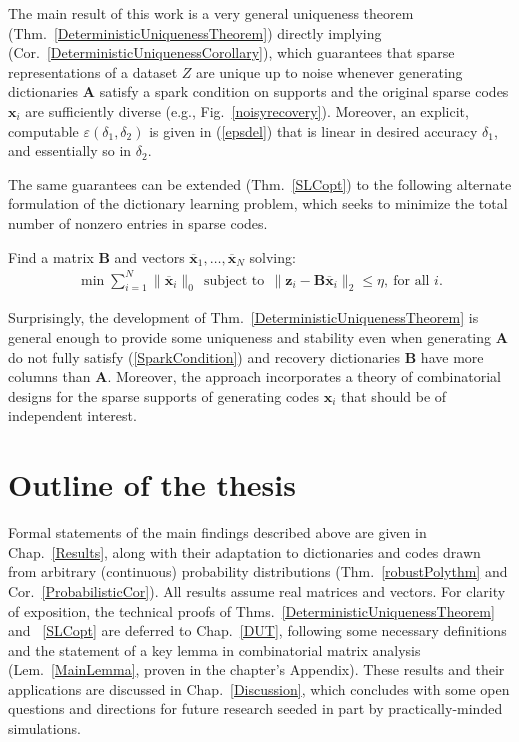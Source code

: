 The main result of this work is a very general uniqueness theorem (Thm.~\ref{DeterministicUniquenessTheorem}) directly 
implying (Cor.~\ref{DeterministicUniquenessCorollary}), which guarantees that sparse representations of a dataset $Z$ are unique up to noise whenever generating dictionaries $\mathbf{A}$ satisfy a spark condition on supports and the original sparse codes $\mathbf{x}_i$ are sufficiently diverse (e.g., Fig.~\ref{noisyrecovery}).  Moreover, an explicit, computable $\varepsilon(\delta_1, \delta_2)$ is given in (\ref{epsdel}) that is linear in desired accuracy $\delta_1$, and essentially so in $\delta_2$.

The same guarantees can be extended (Thm.~\ref{SLCopt}) to the following alternate formulation of the dictionary learning problem, which seeks to minimize the total number of nonzero entries in sparse codes.

\begin{problem}\label{OptimizationProblem}
Find a matrix $\mathbf{B}$ and vectors \mbox{$\mathbf{\overline x}_1, \ldots, \mathbf{\overline x}_N$} solving:
\begin{align}\label{minsum}
\min \sum_{i = 1}^N \|\mathbf{\overline x}_{i}\|_0 \ \
\text{subject to} \ \ \|\mathbf{z}_i - \mathbf{B}\mathbf{\overline x}_i\|_2 \leq \eta, \ \text{for all $i$}.
\end{align}
\end{problem}

Surprisingly, the development of Thm.~\ref{DeterministicUniquenessTheorem} is general enough to provide some uniqueness and stability even when generating $\mathbf{A}$ do not fully satisfy (\ref{SparkCondition}) and recovery dictionaries $\mathbf{B}$ have more columns than $\mathbf{A}$.  Moreover, the approach incorporates a theory of combinatorial designs for the sparse supports of generating codes $\mathbf{x}_i$ that should be of independent interest. 

\section{Outline of the thesis}

Formal statements of the main findings described above are given in Chap.~\ref{Results}, along with their adaptation to dictionaries and codes drawn from arbitrary (continuous) probability distributions (Thm.~\ref{robustPolythm} and Cor.~\ref{ProbabilisticCor}). All results assume real matrices and vectors. For clarity of exposition, the technical proofs of Thms.~\ref{DeterministicUniquenessTheorem} and ~\ref{SLCopt} are deferred to Chap.~\ref{DUT}, following some necessary definitions and the statement of a key lemma in combinatorial matrix analysis (Lem.~\ref{MainLemma}, proven in the chapter's Appendix). These results and their applications are discussed in Chap.~\ref{Discussion}, which concludes with some open questions and directions for future research seeded in part by practically-minded simulations. 

